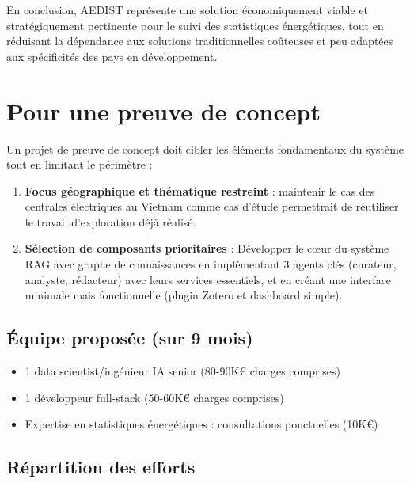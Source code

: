 \documentclass[a4paper,11pt]{report}
\providecommand{\tightlist}{\setlength{\itemsep}{0pt}\setlength{\parskip}{0pt}}
\begin{document}
En conclusion, AEDIST représente une solution économiquement viable et stratégiquement pertinente pour le suivi des statistiques énergétiques, tout en réduisant la dépendance aux solutions traditionnelles coûteuses et peu adaptées aux spécificités des pays en développement.

\section{Pour une preuve de concept}\label{pour-une-preuve-de-concept}

Un projet de preuve de concept doit cibler les éléments fondamentaux du système tout en limitant le périmètre :

\begin{enumerate}
\def\labelenumi{\arabic{enumi}.}
\tightlist
\item
  \textbf{Focus géographique et thématique restreint} : maintenir le cas des centrales électriques au Vietnam comme cas d'étude permettrait de réutiliser le travail d'exploration déjà réalisé.
\item
  \textbf{Sélection de composants prioritaires} : Développer le cœur du système RAG avec graphe de connaissances en implémentant 3 agents clés (curateur, analyste, rédacteur) avec leurs services essentiels, et en créant une interface minimale mais fonctionnelle (plugin Zotero et dashboard simple).
\end{enumerate}

\subsection{Équipe proposée (sur 9 mois)}\label{uxe9quipe-proposuxe9e-sur-9-mois}

\begin{itemize}
\tightlist
\item
  1 data scientist/ingénieur IA senior (80-90K€ charges comprises)
\item
  1 développeur full-stack (50-60K€ charges comprises)
\item
  Expertise en statistiques énergétiques : consultations ponctuelles (10K€)
\end{itemize}

\subsection{Répartition des efforts}\label{ruxe9partition-des-efforts}
\end{document}
